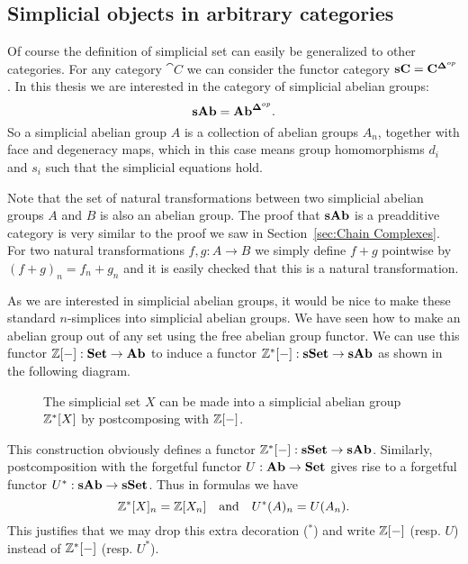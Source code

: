 \subsection{Simplicial objects in arbitrary categories}
Of course the definition of simplicial set can easily be generalized to other categories. For any category $\cat{C}$ we can consider the functor category $\mathbf{sC} = \mathbf{C}^{\mathbf{\Delta}^{op}}$. In this thesis we are interested in the category of simplicial abelian groups:
$$ \mathbf{sAb} = \mathbf{Ab}^{\mathbf{\Delta}^{op}}. $$
So a simplicial abelian group $A$ is a collection of abelian groups $A_n$, together with face and degeneracy maps, which in this case means group homomorphisms $d_i$ and $s_i$ such that the simplicial equations hold.

Note that the set of natural transformations between two simplicial abelian groups $A$ and $B$ is also an abelian group. The proof that $\mathbf{sAb}$ is a preadditive category is very similar to the proof we saw in Section~\ref{sec:Chain Complexes}. For two natural transformations $f,g: A \to B$ we simply define $f+g$ pointwise by $(f+g)_n = f_n + g_n$ and it is easily checked that this is a natural transformation.

As we are interested in simplicial abelian groups, it would be nice to make these standard $n$-simplices into simplicial abelian groups. We have seen how to make an abelian group out of any set using the free abelian group functor. We can use this functor $\mathbb{Z}[-] : \mathbf{Set} \to \mathbf{Ab}$ to induce a functor $\mathbb{Z}^\ast[-] : \mathbf{sSet} \to \mathbf{sAb}$ as shown in the following diagram.
\begin{figure}[h!]
	\caption{The simplicial set $X$ can be made into a simplicial abelian group $\mathbb{Z}^\ast[X]$ by postcomposing with $\mathbb{Z}[-]$.}
	\label{fig:diagram_Z}
\end{figure}
This construction obviously defines a functor $\mathbb{Z}^\ast[-] : \mathbf{sSet} \to \mathbf{sAb}$. Similarly, postcomposition with the forgetful functor $U: \mathbf{Ab} \to \mathbf{Set}$ gives rise to a forgetful functor $U^\ast: \mathbf{sAb} \to \mathbf{sSet}$. Thus in formulas we have
$$ \mathbb{Z}^\ast[X]_n = \mathbb{Z}[X_n] \quad\text{and}\quad U^\ast(A)_n = U(A_n). $$
This justifies that we may drop this extra decoration ($^\ast$) and write $\mathbb{Z}[-]$ (resp. $U$) instead of $\mathbb{Z}^\ast[-]$ (resp. $U^\ast$).

